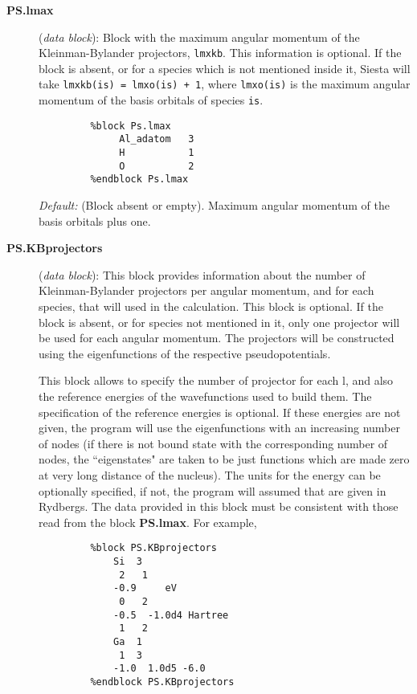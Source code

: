 \documentclass[11pt]{article}
\begin{document}
\begin{description}

\item[{\bf PS.lmax}]  ({\it data block}):
Block with the maximum angular momentum of the Kleinman-Bylander
projectors, {\tt lmxkb}.
This information is optional. If the block
is absent, or for a species which is not mentioned inside
it, {\sc Siesta} will take {\tt lmxkb(is) = lmxo(is) + 1}, where {\tt lmxo(is)}
is the maximum angular momentum of the basis orbitals of species {\tt is}.
\begin{verbatim}
         %block Ps.lmax
              Al_adatom   3
              H           1
              O           2
         %endblock Ps.lmax
\end{verbatim}
{\it Default:} (Block absent or empty). Maximum angular momentum
of the basis orbitals plus one.
\noindent

\item[{\bf PS.KBprojectors}] ({\it data block}):
This block provides information about the number of Kleinman-Bylander
projectors per angular momentum, and for each species, that will used
in the calculation. This block is optional.
If the block is absent, or for species not mentioned in it, only
one projector will be used for each angular momentum. The projectors
will be constructed using the eigenfunctions of the respective
pseudopotentials.


This block allows to specify the number of projector for each l, and also
the reference energies of the wavefunctions used to build them.
The specification of the reference energies is optional. If these
energies are not given, the program will use the eigenfunctions with an
increasing number of nodes (if there is not bound state with
the corresponding number of nodes, the ``eigenstates" are taken to be just
functions which are made zero at very long distance of the nucleus).
The units for the energy can be optionally specified, if not, the
program will assumed that are given in Rydbergs.
The data provided in this block must be consistent with those
read from the block {\bf PS.lmax}. For example,

\begin{verbatim}
         %block PS.KBprojectors
             Si  3
              2   1
             -0.9     eV
              0   2
             -0.5  -1.0d4 Hartree
              1   2
             Ga  1
              1  3
             -1.0  1.0d5 -6.0
         %endblock PS.KBprojectors
\end{verbatim}


\end{description}
\end{document}
